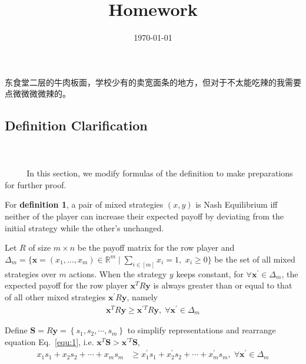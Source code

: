 \documentclass[oneside,solution]{seu-ml-assign}
\title{Homework}
\author{}
\date{\today}
\begin{document}
\maketitle
\begin{CJK}{UTF8}{gbsn}
东食堂二层的牛肉板面，学校少有的卖宽面条的地方，但对于不太能吃辣的我需要点微微微微辣的。
\end{CJK}

\subsection{Definition Clarification}
\\ \hspace*{\fill} \\
$\text{        }\quad\text{  }$ In this section, we modify formulas of the definition to make
preparations for further proof.

For \textbf{definition 1}, a pair of mixed strategies \((x,y)\) is Nash
Equilibrium iff neither of the player can increase their expected payoff
by deviating from the initial strategy while the other's unchanged.

Let \(R\) of size \(m\times n\) be the payoff matrix for the row player
and
\(\Delta_m=\{\mathbf{x}=\left(x_{1}, \ldots, x_{m}\right) \in \mathbb{R}^{m} \mid \sum_{i\in[m]}x_i=1,\)
\(x_i\geq 0 \}\)
be the set of all mixed strategies over \(m\) actions. When the strategy
\(y\) keeps constant, for \(\forall \mathbf{x^{'}} \in \Delta_m\), the
expected payoff for the row player \(\mathbf{x}^TR\mathbf{y}\) is always
greater than or equal to that of all other mixed strategies
\(\mathbf{x^{'}}R\mathbf{y}\), namely
\begin{equation}
\begin{aligned}
\mathbf{x}^TR\mathbf{y} \geq \mathbf{x}^{'T}R\mathbf{y},\; \forall \mathbf{x^{'}} \in \Delta_m
\end{aligned}
\label{equ:1}
\end{equation}

Define \(\mathbf{S}=R\mathbf{y} = \left\{s_1,s_2,\cdots,s_m\right\}\) to
simplify representations and rearrange equation Eq.~\eqref{equ:1}, i.e.
\(\mathbf{x}^{T}\mathbf{S}>\mathbf{x}^{'T}\mathbf{S}\),
\begin{equation}
\begin{aligned}
x_1s_1+x_2s_2+\cdots+x_ms_m&\geq x_1^{'}s_1+x_2^{'}s_2+\cdots+x_m^{'}s_m,\; \forall \mathbf{x^{'}} \in \Delta_m
\end{aligned}
\end{equation}
\end{document}
